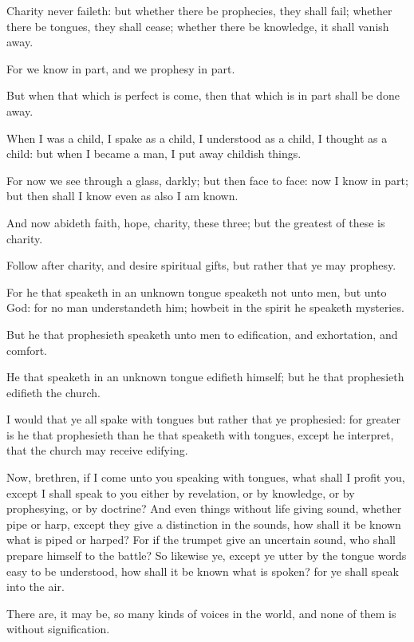 \Verse Charity never faileth: but whether there be prophecies, they shall fail; whether there be tongues, they shall cease; whether there be knowledge, it shall vanish away.

\Verse For we know in part, and we prophesy in part.

\Verse But when that which is perfect is come, then that which is in part shall be done away.

\Verse When I was a child, I spake as a child, I understood as a child, I thought as a child: but when I became a man, I put away childish things.

\Verse For now we see through a glass, darkly; but then face to face: now I know in part; but then shall I know even as also I am known.

\Verse And now abideth faith, hope, charity, these three; but the greatest of these is charity.


\Chapter
\Verse Follow after charity, and desire spiritual gifts, but rather that ye may prophesy.

\Verse For he that speaketh in an unknown tongue speaketh not unto men, but unto God: for no man understandeth him; howbeit in the spirit he speaketh mysteries.

\Verse But he that prophesieth speaketh unto men to edification, and exhortation, and comfort.

\Verse He that speaketh in an unknown tongue edifieth himself; but he that prophesieth edifieth the church.

\Verse I would that ye all spake with tongues but rather that ye prophesied: for greater is he that prophesieth than he that speaketh with tongues, except he interpret, that the church may receive edifying.

\Verse Now, brethren, if I come unto you speaking with tongues, what shall I profit you, except I shall speak to you either by revelation, or by knowledge, or by prophesying, or by doctrine?  \Verse And even things without life giving sound, whether pipe or harp, except they give a distinction in the sounds, how shall it be known what is piped or harped?  \Verse For if the trumpet give an uncertain sound, who shall prepare himself to the battle?  \Verse So likewise ye, except ye utter by the tongue words easy to be understood, how shall it be known what is spoken? for ye shall speak into the air.

\Verse There are, it may be, so many kinds of voices in the world, and none of them is without signification.

